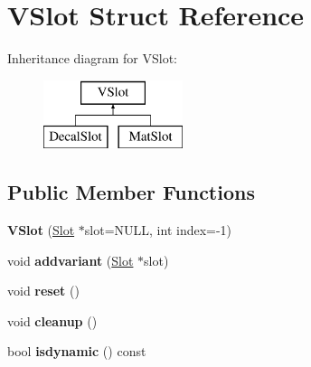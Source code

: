 \hypertarget{struct_v_slot}{}\section{V\+Slot Struct Reference}
\label{struct_v_slot}
Inheritance diagram for V\+Slot\+:\begin{figure}[H]
\begin{center}
\leavevmode
\includegraphics[height=2.000000cm]{struct_v_slot}
\end{center}
\end{figure}
\subsection*{Public Member Functions}
\begin{DoxyCompactItemize}
\item 
\mbox{\label{struct_v_slot_ad1445e091eca4c4c74044444704e1887}} 
{\bfseries V\+Slot} (\hyperlink{struct_slot}{Slot} $\ast$slot=N\+U\+LL, int index=-\/1)
\item 
\mbox{\label{struct_v_slot_a0f5862ef56c521251fbbd1641a970f1e}} 
void {\bfseries addvariant} (\hyperlink{struct_slot}{Slot} $\ast$slot)
\item 
\mbox{\label{struct_v_slot_ae668b948cfc74664df61e8b30d481dda}} 
void {\bfseries reset} ()
\item 
\mbox{\label{struct_v_slot_a1b6f9ecee7c32823d63961e75cb47bdf}} 
void {\bfseries cleanup} ()
\item 
\mbox{\label{struct_v_slot_a34f340dacd8f4c27b78613728cb63291}} 
bool {\bfseries isdynamic} () const
\end{DoxyCompactItemize}
